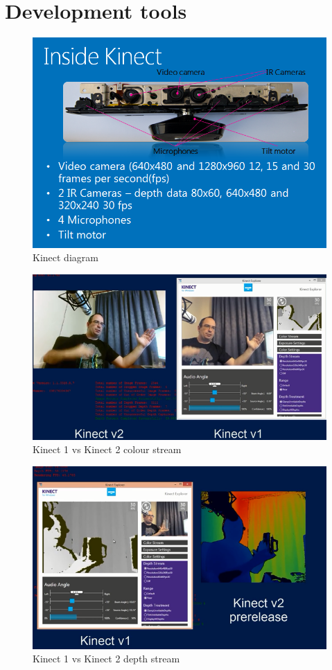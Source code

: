 \chapter{Development tools}
\label{chap:development-tools}

\begin{figure}[h]
\centering
\includegraphics[width=1\columnwidth]{AppendixA/A/kinect.png}
\\
Kinect diagram
\end{figure}


\begin{figure}[h]
\centering
\includegraphics[width=0.8\columnwidth]{AppendixA/A/color1.png}
\\
Kinect 1 vs Kinect 2 colour stream
\end{figure}

\begin{figure}[h]
\centering
\includegraphics[width=0.8\columnwidth]{AppendixA/A/depth1.png}
\\
Kinect 1 vs Kinect 2 depth stream
\end{figure}



